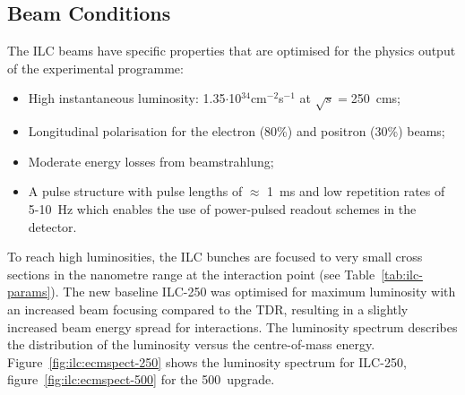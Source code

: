 \subsection{Beam Conditions} \label{sec:beam:conditions}
The ILC beams have specific properties that are optimised for the physics output of the experimental programme:
\begin{itemize}
\item High instantaneous luminosity: 1.35$\cdot$10$^{34}$cm$^{-2}$s$^{-1}$ at $\sqrt{s}=$250~\GeV cms;
\item Longitudinal polarisation for the electron (80\%) and positron (30\%) beams;
\item Moderate energy losses from beamstrahlung;
\item A pulse structure with pulse lengths of $\approx$ 1~ms and low repetition rates of 5-10~Hz which enables the use of power-pulsed readout schemes in the detector.
\end{itemize}
To reach high luminosities, the ILC bunches are focused to very small cross sections in the nanometre range at the interaction point (see Table~\ref{tab:ilc-params}). The new baseline ILC-250 was optimised for maximum luminosity with an increased beam focusing compared to the TDR, resulting in a slightly increased beam energy spread for interactions. The luminosity spectrum describes the distribution of the luminosity versus the centre-of-mass energy. Figure~\ref{fig:ilc:ecmspect-250} shows the luminosity spectrum for ILC-250, figure~\ref{fig:ilc:ecmspect-500} for the 500~\GeV upgrade.

